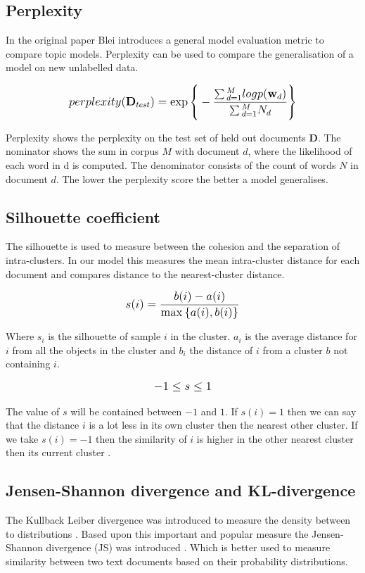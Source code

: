 \subsection{Perplexity}\label{research:perplexity}
In the original paper Blei introduces a general model evaluation metric \cite{Blei2003} to compare topic models. Perplexity can be used to compare the generalisation of a model on new unlabelled data.

\[
   \mathlarger{perplexity(\textbf{D}_{test}) = \exp{\Bigg \{ -\frac{\sum{}_{d=1}^{M}logp(\textbf{w}_d)}{\sum{}_{d=1}^{M}N_d} \Bigg \}}}
\]

Perplexity shows the perplexity on the test set of held out documents $\textbf{D}$. The nominator shows the sum in  corpus $M$ with document $d$, where the likelihood of each word in d is computed. The denominator consists of the count of words $N$ in document $d$.
The lower the perplexity score the better a model generalises. 


\subsection{Silhouette coefficient} \label{research:silhouette}
The silhouette is used to measure between the cohesion and the separation of intra-clusters. In our model this measures the mean intra-cluster distance for each document and compares distance to the nearest-cluster distance.

\[
   \mathlarger{s(i) = \frac{b(i) - a(i)}{\max{\{ a(i), b(i)}\} } }
\]

Where $s_i$ is the silhouette of sample $i$ in the cluster. $a_i$ is the average distance for $i$ from all the objects in the cluster and $b_i$ the distance of $i$ from a cluster $b$ not containing $i$. 

\[
\mathlarger{-1 \leq s \le 1}
\]

The value of $s$ will be contained between $-1$ and $1$. If $s(i) = 1$ then we can say that the distance $i$  is a lot less in its own cluster then the nearest other cluster. If we take $s(i) = -1$ then the similarity of $i$ is higher in the other nearest cluster then its current cluster \cite{Rousseeuw1987Silhouettes:Analysis}.


\subsection{Jensen-Shannon divergence and KL-divergence} \label{research:jsdivergence}
The Kullback Leiber divergence was introduced to measure the density between to distributions \cite{Hershey2007ApproximatingModels}. Based upon this important and popular measure the Jensen-Shannon divergence (JS) was introduced \cite{Fuglede2004Jensen-ShannonEmbedding}. Which is better used to measure similarity between two text documents based on their probability distributions.

